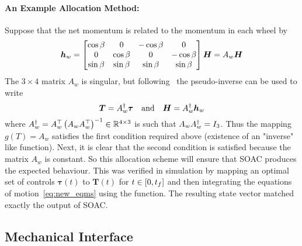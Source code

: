 \documentclass[10pt]{article}
\begin{document}
\paragraph{An Example Allocation Method:} Suppose that the net momentum is related to the momentum in each wheel by
\begin{equation}
\bm{h}_w = \begin{bmatrix}
\cos\beta & 0 & -\cos\beta & 0 \\ 0 & \cos\beta & 0 & -\cos\beta \\ \sin\beta & \sin\beta & \sin\beta & \sin\beta
\end{bmatrix} \bm{H} = A_w \bm{H}
\end{equation}
The $3\times 4$ matrix $A_w$ is singular, but following~\cite[\S 7.3.4]{Sidi1997} the pseudo-inverse can be used to write 
\begin{equation}
\bm{T} = A_w^{\dagger} \bm{\tau} \quad \text{and} \quad \bm{H} = A_w^{\dagger} \bm{h}_w
\end{equation}
where $A_w^{\dagger} = A_w^{\top} \left(A_w A_w^{\top}\right)^{-1} \in {\mathbb{R}}^{4\times 3}$
is such that $A_w A_w^{\dagger} = I_{3}$. Thus the mapping $g(T) = A_w$ satisfies the first condition required above (existence of an "inverse" like function). Next, it is clear that the second condition is satisfied because the matrix $A_w$ is constant. So this allocation scheme will ensure that SOAC produces the expected behaviour. This was verified in simulation by mapping an optimal set of controls $\bm{\tau}(t)$ to $\bm{T}(t)$ for $t\in[0,t_f]$ and then integrating the equations of motion~\eqref{eq:new_eqms} using the  function. The resulting state vector matched exactly the output of SOAC.




\subsection{Mechanical Interface}\label{sec2:mech_interface}
\end{document}

